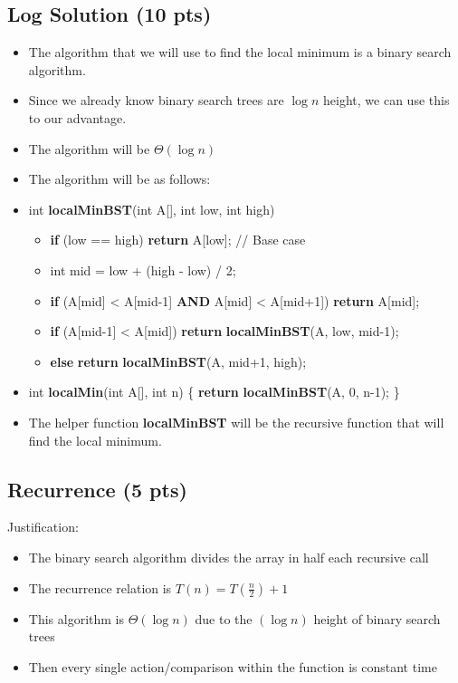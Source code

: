 \documentclass{article}[12pt]
\begin{document}
\pagebreak

\vspace*{10px}
\subsection{Log Solution (10 pts)}

\begin{itemize}
  \item The algorithm that we will use to find the local minimum is a binary search algorithm.
  \item Since we already know binary search trees are $\log n$ height, we can use this to our advantage.
  \item The algorithm will be $\Theta(\log n)$
  \item The algorithm will be as follows:
  \item int \textbf{localMinBST}(int A[], int low, int high)
    \begin{itemize}
      \item \textbf{if} (low == high) \textbf{return} A[low]; // Base case
      \item int mid = low + (high - low) / 2;
      \item \textbf{if} (A[mid] < A[mid-1] \textbf{AND} A[mid] < A[mid+1]) \textbf{return} A[mid];
      \item \textbf{if} (A[mid-1] < A[mid]) \textbf{return} \textbf{localMinBST}(A, low, mid-1);
      \item \textbf{else} \textbf{return} \textbf{localMinBST}(A, mid+1, high);
    \end{itemize}
  \item int \textbf{localMin}(int A[], int n) \{ \textbf{return} \textbf{localMinBST}(A, 0, n-1); \}
  \item The helper function \textbf{localMinBST}
    will be the recursive function that will find the local minimum.
\end{itemize}

\vspace*{10px}
\subsection{Recurrence (5 pts)}
Justification:
\begin{itemize}
  \item The binary search algorithm divides the array in half each recursive call
  \item The recurrence relation is $T(n) = T(\frac{n}{2}) + 1$
  \item This algorithm is $\Theta(\log n)$ due to the $(\log n)$ height of binary search trees
  \item Then every single action/comparison within the function is constant time
\end{itemize}
\end{document}
